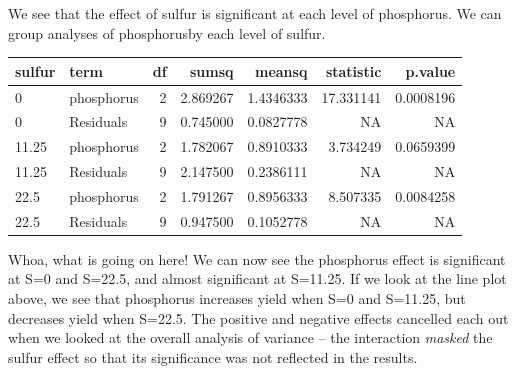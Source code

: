 \documentclass[
]{book}
\newenvironment{Shaded}{\begin{snugshade}}{\end{snugshade}}
\newcommand{\AttributeTok}[1]{\textcolor[rgb]{0.77,0.63,0.00}{#1}}
\newcommand{\FunctionTok}[1]{\textcolor[rgb]{0.00,0.00,0.00}{#1}}
\newcommand{\NormalTok}[1]{#1}
\newcommand{\OtherTok}[1]{\textcolor[rgb]{0.56,0.35,0.01}{#1}}
\newcommand{\SpecialCharTok}[1]{\textcolor[rgb]{0.00,0.00,0.00}{#1}}
\newcommand{\StringTok}[1]{\textcolor[rgb]{0.31,0.60,0.02}{#1}}
\begin{document}
We see that the effect of sulfur is significant at each level of phosphorus. We can group analyses of phosphorusby each level of sulfur.

\begin{Shaded}
\end{Shaded}

\begin{tabular}{l|l|r|r|r|r|r}
\hline
sulfur & term & df & sumsq & meansq & statistic & p.value\\
\hline
0 & phosphorus & 2 & 2.869267 & 1.4346333 & 17.331141 & 0.0008196\\
\hline
0 & Residuals & 9 & 0.745000 & 0.0827778 & NA & NA\\
\hline
11.25 & phosphorus & 2 & 1.782067 & 0.8910333 & 3.734249 & 0.0659399\\
\hline
11.25 & Residuals & 9 & 2.147500 & 0.2386111 & NA & NA\\
\hline
22.5 & phosphorus & 2 & 1.791267 & 0.8956333 & 8.507335 & 0.0084258\\
\hline
22.5 & Residuals & 9 & 0.947500 & 0.1052778 & NA & NA\\
\hline
\end{tabular}

Whoa, what is going on here! We can now see the phosphorus effect is significant at S=0 and S=22.5, and almost significant at S=11.25. If we look at the line plot above, we see that phosphorus increases yield when S=0 and S=11.25, but decreases yield when S=22.5. The positive and negative effects cancelled each out when we looked at the overall analysis of variance -- the interaction \emph{masked} the sulfur effect so that its significance was not reflected in the results.
\end{document}
